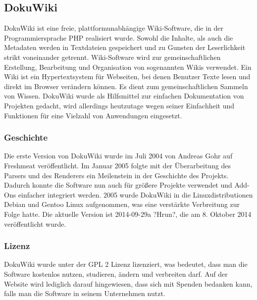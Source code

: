 \subsection*{DokuWiki}
DokuWiki ist eine freie, plattformunabhängige Wiki-Software, die in der Programmiersprache PHP realisiert wurde. Sowohl die Inhalte, als auch die Metadaten werden in Textdateien gespeichert und zu Gunsten der Leserlichkeit strikt voneinander getrennt. Wiki-Software wird zur gemeinschaftlichen Erstellung, Bearbeitung und Organisation von sogenannten Wikis verwendet. Ein Wiki ist ein Hypertextsystem für Webseiten, bei denen Benutzer Texte lesen und direkt im Browser verändern können. Es dient zum gemeinschaftlichen Sammeln von Wissen. DokuWiki wurde als Hilfsmittel zur einfachen Dokumentation von Projekten gedacht, wird allerdings heutzutage wegen seiner Einfachheit und Funktionen für eine Vielzahl von Anwendungen eingesetzt.
\subsubsection*{Geschichte}
Die erste Version von DokuWiki wurde im Juli 2004 von Andreas Gohr auf Freshmeat veröffentlicht. Im Januar 2005 folgte mit der Überarbeitung des Parsers und des Renderers ein Meilenstein in der Geschichte des Projekts. Dadurch konnte die Software nun auch für größere Projekte verwendet und Add-Ons einfacher integriert werden. 2005 wurde DokuWiki in die Linuxdistributionen Debian und Gentoo Linux aufgenommen, was eine verstärkte Verbreitung zur Folge hatte. Die aktuelle Version ist 2014-09-29a ?Hrun?, die am 8. Oktober 2014 veröffentlicht wurde.
\subsubsection*{Lizenz}
DokuWiki wurde unter der GPL 2 Lizenz lizenziert, was bedeutet, dass man die Software kostenlos nutzen, studieren, ändern und verbreiten darf. Auf der Website wird lediglich darauf hingewiesen, dass sich mit Spenden bedanken kann, falls man die Software in seinem Unternehmen nutzt.
